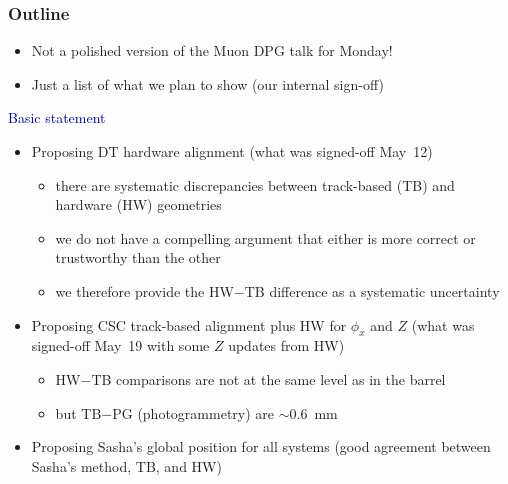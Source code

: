 \documentclass[compress]{beamer}
\begin{document}
\begin{frame}
\frametitle{Outline}
\begin{itemize}
\item Not a polished version of the Muon DPG talk for Monday!
\item Just a list of what we plan to show (our internal sign-off)
\end{itemize}

\vfill
\hspace{-0.83 cm} \textcolor{darkblue}{\Large Basic statement}

\begin{itemize}
\item Proposing DT hardware alignment (what was signed-off May~12)
\begin{itemize}
\item there are systematic discrepancies between track-based (TB) and hardware (HW) geometries
\item we do not have a compelling argument that either is more correct or trustworthy than the other
\item we therefore provide the HW$-$TB difference as a systematic uncertainty
\end{itemize}
\item Proposing CSC track-based alignment plus HW for $\phi_x$ and $Z$ (what was signed-off May~19 with some $Z$ updates from HW)
\begin{itemize}
\item HW$-$TB comparisons are not at the same level as in the barrel
\item but TB$-$PG (photogrammetry) are $\sim$0.6~mm
\end{itemize}
\item Proposing Sasha's global position for all systems (good
agreement between Sasha's method, TB, and HW)
\end{itemize}
\end{frame}
\end{document}

